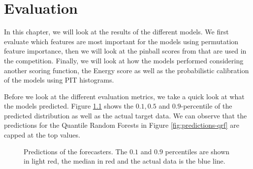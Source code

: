 \chapter{Evaluation}
\label{ch:evaluation}

In this chapter, we will look at the results of the different models. 
We first evaluate which features are most important for the models using 
permutation feature importance, then we will look at the pinball scores from 
that are used in the competition. Finally, we will look at how the models performed 
considering another scoring function, the Energy score as well as the probabilistic calibration 
of the models using PIT histograms.

Before we look at the different evaluation metrics, 
we take a quick look at what the models predicted. 
Figure \ref{fig:predictions} shows the \(0.1, 0.5\) and \(0.9\)-percentile 
of the predicted distribution as well as the actual target data.
We can observe that the predictions for the Quantile Random Forests in Figure \ref{fig:predictions-qrf} are 
capped at the top values. 

\begin{figure}[h]%
    \centering
    \caption[Predictions]{Predictions of the forecasters. The \(0.1\) and \(0.9\) percentiles are shown in light red, the median in red and the actual data is the blue line.}%
    \label{fig:predictions}%
\end{figure}







